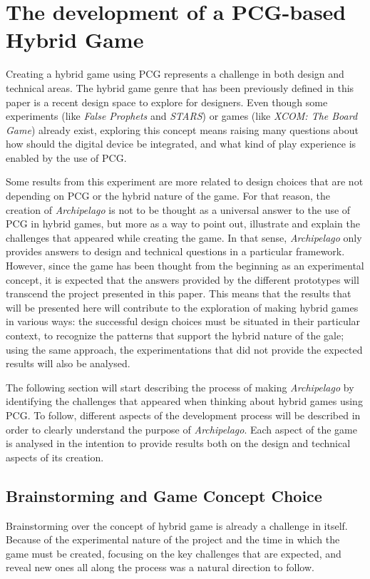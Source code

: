 \chapter{The development of a PCG-based Hybrid Game}
Creating a hybrid game using PCG represents a challenge in both design and technical areas. The hybrid game genre that has been previously defined in this paper is a recent design space to explore for designers. Even though some experiments (like \textit{False Prophets} and \textit{STARS}) or games (like \textit{XCOM: The Board Game}) already exist, exploring this concept means raising many questions about how should the digital device be integrated, and what kind of play experience is enabled by the use of PCG.

Some results from this experiment are more related to design choices that are not depending on PCG or the hybrid nature of the game. For that reason, the creation of \textit{Archipelago} is not to be thought as a universal answer to the use of PCG in hybrid games, but more as a way to point out, illustrate and explain the challenges that appeared while creating the game. In that sense, \textit{Archipelago} only provides answers to design and technical questions in a particular framework. However, since the game has been thought from the beginning as an experimental concept, it is expected that the answers provided by the different prototypes will transcend the project presented in this paper. This means that the results that will be presented here will contribute to the exploration of making hybrid games in various ways: the successful design choices must be situated in their particular context, to recognize the patterns that support the hybrid nature of the gale; using the same approach, the experimentations that did not provide the expected results will also be analysed.

The following section will start describing the process of making \textit{Archipelago} by identifying the challenges that appeared when thinking about hybrid games using PCG. To follow, different aspects of the development process will be described in order to clearly understand the purpose of \textit{Archipelago}. Each aspect of the game is analysed in the intention to provide results both on the design and technical aspects of its creation. 
\section{Brainstorming and Game Concept Choice}
Brainstorming over the concept of hybrid game is already a challenge in itself. Because of the experimental nature of the project and the time in which the game must be created, focusing on the key challenges that are expected, and reveal new ones all along the process was a natural direction to follow.

